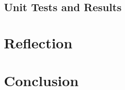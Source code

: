 \documentclass[a4paper,11pt]{article}
\begin{document}
\subsection{Unit Tests and Results}


\pagebreak


\pagebreak
\section{Reflection}


\pagebreak
\section{Conclusion}


\pagebreak


\pagebreak
\appendix

\end{document}
